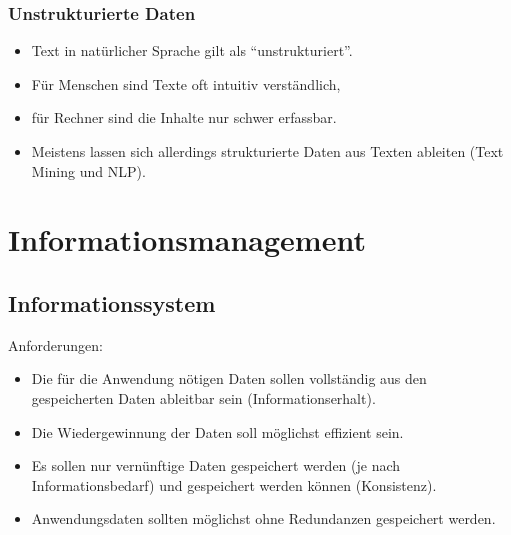 			\subsubsection{Unstrukturierte Daten} %
				\begin{itemize}
					\item Text in natürlicher Sprache gilt als \enquote{unstrukturiert}.
					\item Für Menschen sind Texte oft intuitiv verständlich,
					\item für Rechner sind die Inhalte nur schwer erfassbar.
					\item Meistens lassen sich allerdings strukturierte Daten aus Texten ableiten (Text Mining und NLP).
				\end{itemize}

	\section{Informationsmanagement} %
		\subsection{Informationssystem} %
			Anforderungen:
			\begin{itemize}
				\item Die für die Anwendung nötigen Daten sollen vollständig aus den gespeicherten Daten ableitbar sein (Informationserhalt).
				\item Die Wiedergewinnung der Daten soll möglichst effizient sein.
				\item Es sollen nur vernünftige Daten gespeichert werden (je nach Informationsbedarf) und gespeichert werden können (Konsistenz).
				\item Anwendungsdaten sollten möglichst ohne Redundanzen gespeichert werden.
			\end{itemize}

